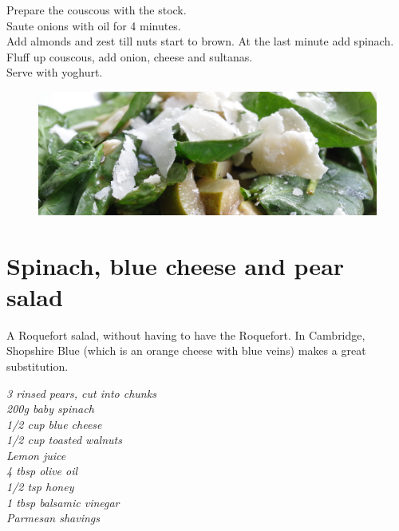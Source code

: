 \documentclass{tufte-book}
\begin{document}
\smallskip
Prepare the couscous with the stock.
\\Saute onions with oil for 4 minutes.
\\Add almonds and zest till nuts start to brown. At the last minute add spinach.
\\Fluff up couscous, add onion, cheese and sultanas.
\\Serve with yoghurt.

\newpage

\begin{figure}[h]
  \includegraphics[width=\linewidth]{pearsalad.JPG}
\end{figure}

\section{Spinach, blue cheese and pear salad}

A Roquefort salad, without having to have the Roquefort. In Cambridge, Shopshire Blue (which is an orange cheese with blue veins) makes a great substitution.

\smallskip
\emph{3 rinsed pears, cut into chunks
\\200g baby spinach
\\1/2 cup blue cheese
\\1/2 cup toasted walnuts
\\Lemon juice
\\4 tbsp olive oil
\\1/2 tsp honey
\\1 tbsp balsamic vinegar
\\Parmesan shavings
}
\end{document}
